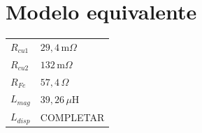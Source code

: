 \documentclass[a4paper,11pt]{article}
\begin{document}
\vspace{5mm}

\section*{Modelo equivalente}

\begin{tabular}{ll}
\toprule
$R_{cu1}$ & $29{,}4\,\text{m}\Omega$ \\
$R_{cu2}$ & $132\,\text{m}\Omega$ \\
$R_{Fe}$ & $57{,}4\,\Omega$ \\
$L_{mag}$ & $39{,}26\,\mu\text{H}$ \\
$L_{disp}$ & COMPLETAR \\
\bottomrule
\end{tabular}
\end{document}
